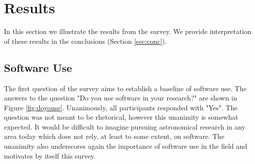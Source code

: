 \section{Results}
\label{sec:res}

In this section we illustrate the results from the survey. We provide interpretation of these results in the conclusions (Section \ref{sec:conc}).

\subsection{Software Use}

The first question of the survey aims to establish a baseline of software use. The answers to the question "Do you use software in your research?" are shown in Figure \ref{fig:doyouse}. Unanimously, all participants responded with "Yes". The question was not meant to be rhetorical, however this unanimity is somewhat expected. It would be difficult to imagine pursuing astronomical research in any area today which does not rely, at least to some extent, on software. The unanimity also underscores again the importance of software use in the field and motivates by itself this survey.